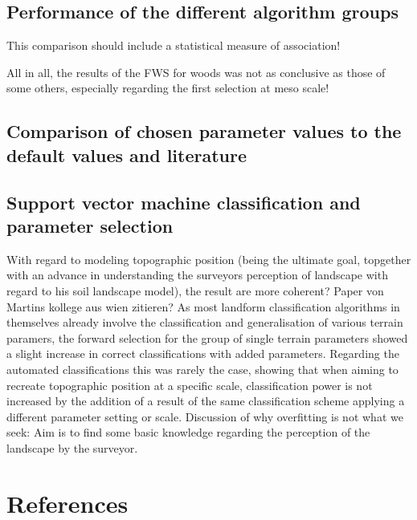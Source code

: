 \documentclass[final,1p,times,twocolumn,authoryear]{elsarticle}
\begin{document}
\subsection{Performance of the different algorithm groups} 
This comparison should include a statistical measure of association!

All in all, the results of the FWS for woods was not as conclusive as those of some others, especially regarding the first selection at meso scale!
\subsection{Comparison of chosen parameter values to the default values and literature} 



\subsection{Support vector machine classification and parameter selection}
With regard to modeling topographic position (being the ultimate goal, topgether with an advance in understanding the surveyors perception of landscape with regard to his soil landscape model), the result are more coherent? Paper von Martins kollege aus wien zitieren?
As most landform classification algorithms in themselves already involve the classification and generalisation of various terrain paramers, the forward selection for the group of single terrain parameters showed a slight increase in correct classifications with added parameters. Regarding the automated classifications this was rarely the case, showing that when aiming to recreate topographic position at a specific scale, classification power is not increased by the addition of a result of the same classification scheme applying a different parameter setting or scale.
Discussion of why overfitting is not what we seek: Aim is to find some basic knowledge regarding the perception of the landscape by the surveyor.


\clearpage
\section*{References}

\end{document}
